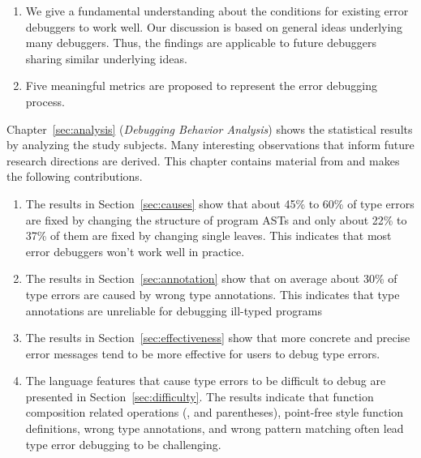 \documentclass[12pt]{report}	%
\begin{document}
\begin{enumerate}
\item We give a fundamental understanding about the conditions for existing error debuggers to work well.
Our discussion is based on general ideas underlying many debuggers.
Thus, the findings are applicable to future debuggers sharing similar underlying ideas.

\item Five meaningful metrics are proposed to represent the error debugging process.
\end{enumerate}



Chapter~\ref{sec:analysis} (\emph{Debugging Behavior Analysis}) shows the statistical results by analyzing the study subjects.
Many interesting observations that inform future research directions are derived.
This chapter contains material from \cite{wu2017type} and makes the following contributions.

\begin{enumerate}
\item The results in Section~\ref{sec:causes} show that about 45\% to 60\% of type errors are fixed by changing the structure of program ASTs 
and only about 22\% to 37\% of them are fixed by changing single leaves.
This indicates that most error debuggers won't work well in practice.

\item The results in Section~\ref{sec:annotation} show that on average about 30\% of type errors are caused by wrong type annotations.
This indicates that type annotations are unreliable for debugging ill-typed programs

\item The results in Section~\ref{sec:effectiveness} show that more concrete and precise error messages tend to be more effective for users to debug type errors.

\item The language features that cause type errors to be difficult to debug are presented in Section~\ref{sec:difficulty}.
The results indicate that function composition related operations (, \prog{\$} and parentheses),
point-free style function definitions, wrong type annotations, and wrong pattern matching often lead type error debugging to be challenging.
\end{enumerate}
\end{document}

